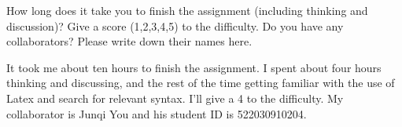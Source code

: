 \documentclass{oxmathproblems}
\begin{document}
\begin{questions}

\miquestion
How long does it take you to finish the assignment (including thinking and discussion)?
Give a score (1,2,3,4,5) to the difficulty.
Do you have any collaborators?
Please write down their names here.

It took me about ten hours to finish the assignment. I spent about four hours thinking and discussing, and the rest of the time getting familiar with the use of Latex and search for relevant syntax.
I'll give a 4 to the difficulty. My collaborator is Junqi You and his student ID is 522030910204.
\end{questions}
\end{document}
